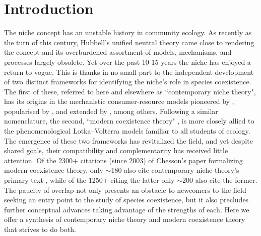 \section{Introduction}
The niche concept has an unstable history in community ecology. As recently as the turn of this century, Hubbell's unified neutral theory \citep{Hubbell2001} came close to rendering the concept and its overburdened assortment of models, mechanisms, and processes largely obsolete. Yet over the past 10-15 years the niche has enjoyed a return to vogue. This is thanks in no small part to the independent development of two distinct frameworks for identifying the niche's role in species coexistence. The first of these, referred to here and elsewhere as ``contemporary niche theory", has its origins in the mechanistic consumer-resource models pioneered by \citet{MacArthur1970}, popularised by \citet{tilman1982}, and extended by \citet{Chase2003}, among others. Following a similar nomenclature, the second,  ``modern coexistence theory" \citep{Chesson2000, Adler2007, Hillerislambers2012}, is more closely allied to the phenomenological Lotka--Volterra models familiar to all students of ecology. The emergence of these two frameworks has revitalized the field, and yet despite shared goals, their compatibility and complementarity has received little attention. Of the 2300+ citations (since 2003) of Chesson's \citeyear{Chesson2000} paper formalizing modern coexistence theory, only $\sim$180 also cite contemporary niche theory's primary text \citep{Chase2003}, while of the 1250+ citing the latter only $\sim$200 also cite the former. The paucity of overlap not only presents an obstacle to newcomers to the field seeking an entry point to the study of species coexistence, but it also precludes further conceptual advances taking advantage of the strengths of each. Here we offer a synthesis of contemporary niche theory and modern coexistence theory that strives to do both.
\par


